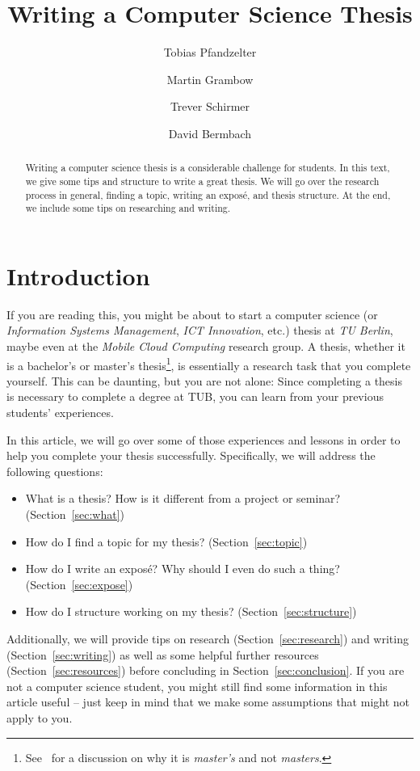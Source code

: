 \documentclass[a4]{article}
\title{Writing a Computer Science Thesis}
\author{Tobias Pfandzelter}
\author{Martin Grambow}
\author{Trever Schirmer}
\author{David Bermbach}
\affil{Mobile Cloud Computing Research Group\\TU Berlin \& Einstein Center Digital Future\\Berlin, Germany\\\texttt{\{tp,mg,ts,db\}@mcc.tu-berlin.de}}
\begin{document}
\maketitle
\begin{abstract}
    Writing a computer science thesis is a considerable challenge for students.
    In this text, we give some tips and structure to write a great thesis.
    We will go over the research process in general, finding a topic, writing an expos\'e, and thesis structure.
    At the end, we include some tips on researching and writing.
\end{abstract}

\section{Introduction}
\label{sec:introduction}

If you are reading this, you might be about to start a computer science (or \emph{Information Systems Management}, \emph{ICT Innovation}, etc.) thesis at \emph{TU Berlin}, maybe even at the \emph{Mobile Cloud Computing} research group.
A thesis, whether it is a bachelor's or master's thesis\footnote{See~\cite{masters-apostrophe-as} for a discussion on why it is \emph{master's} and not \emph{masters}.}, is essentially a research task that you complete yourself.
This can be daunting, but you are not alone: Since completing a thesis is necessary to complete a degree at TUB, you can learn from your previous students' experiences.

In this article, we will go over some of those experiences and lessons in order to help you complete your thesis successfully.
Specifically, we will address the following questions:

\begin{itemize}
    \item What is a thesis? How is it different from a project or seminar? (Section~\ref{sec:what})
    \item How do I find a topic for my thesis? (Section~\ref{sec:topic})
    \item How do I write an expos\'e? Why should I even do such a thing? (Section~\ref{sec:expose})
    \item How do I structure working on my thesis? (Section~\ref{sec:structure})
\end{itemize}

Additionally, we will provide tips on research (Section~\ref{sec:research}) and writing (Section~\ref{sec:writing}) as well as some helpful further resources (Section~\ref{sec:resources}) before concluding in Section~\ref{sec:conclusion}.
If you are not a computer science student, you might still find some information in this article useful -- just keep in mind that we make some assumptions that might not apply to you.
\end{document}
